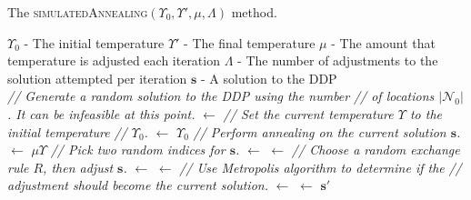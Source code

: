 \documentclass[journal]{IEEEtran}
\begin{document}
\begin{algorithm}[t!]
\caption{The \textsc{simulatedAnnealing}$({\ensuremath{{\ensuremath{\Upsilon}}_0}},{\ensuremath{{\ensuremath{\Upsilon}}'}},{\ensuremath{\mu}}, {\ensuremath{\Lambda}})$ method.}
\label{alg:sa}
\begin{algorithmic}
\Require
\Statex ${\ensuremath{{\ensuremath{\Upsilon}}_0}}$ - The initial temperature
\Statex ${\ensuremath{{\ensuremath{\Upsilon}}'}}$ - The final temperature
\Statex ${\ensuremath{\mu}}$ - The amount that temperature is adjusted each iteration
\Statex ${\ensuremath{\Lambda}}$ - The number of adjustments to the solution attempted per iteration
\Ensure
\Statex ${\ensuremath{\mathbf{s}}}$ - A solution to the DDP
\\
\State \emph{// Generate a random solution to the DDP using the number}
\State \emph{// of locations $|{\ensuremath{{\ensuremath{\mathcal{N}}}_{0}}}|$. It can be infeasible at this point.}
{ $\gets$ {}}
\State \emph{// Set the current temperature ${\ensuremath{\Upsilon}}$ to the initial temperature}
\State \emph{// ${\ensuremath{{\ensuremath{\Upsilon}}_0}}$.}
{\State {${\ensuremath{\Upsilon}}$} $\gets$ {${\ensuremath{{\ensuremath{\Upsilon}}_0}}$}}
\State \emph{// Perform annealing on the current solution ${\ensuremath{\mathbf{s}}}$.}
{\State {${\ensuremath{\Upsilon}}$} $\gets$ {${\ensuremath{\mu}}{\ensuremath{\Upsilon}}$}}
\State \emph{// Pick two random indices for ${\ensuremath{\mathbf{s}}}$.}
{ $\gets$ {}}
{ $\gets$ {}}
\State \emph{// Choose a random exchange rule ${\ensuremath{R}}$, then adjust ${\ensuremath{\mathbf{s}}}$.}
{ $\gets$ {}}
{ $\gets$ {}}
\State \emph{// Use Metropolis algorithm to determine if the}
\State \emph{// adjustment should become the current solution.}
{ $\gets$ {}}
{ $\gets$ {${\ensuremath{\mathbf{s}}}'$}}
\EndIf
\EndFor
\EndWhile
{}
\end{algorithmic}
\end{algorithm}
\end{document}
